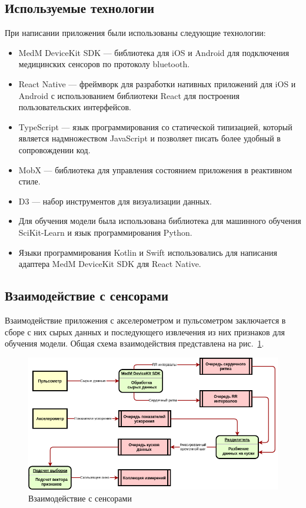 \documentclass[14pt]{matmex-diploma-custom}
\begin{document}
\subsection{Используемые технологии}
При написании приложения были использованы следующие технологии:
\begin{itemize}
\item MedM DeviceKit SDK --- библиотека для iOS и Android для подключения
  медицинских сенсоров по протоколу bluetooth.
\item React Native --- фреймворк для разработки нативных приложений для iOS и
  Android с использованием библиотеки React для построения пользовательских
  интерфейсов.
\item TypeScript --- язык программирования со статической типизацией, который
  является надмножеством JavaScript и позволяет писать более удобный в
  сопровождении код.
\item MobX --- библиотека для управления состоянием приложения в реактивном
  стиле.
\item D3 --- набор инструментов для визуализации данных.
\item Для обучения модели была использована библиотека для машинного обучения
  SciKit-Learn и язык программирования Python.
\item Языки программирования Kotlin и Swift использовались для написания
  адаптера MedM DeviceKit SDK для React Native.
\end{itemize}

\subsection{Взаимодействие с сенсорами}
Взаимодействие приложения с акселерометром и пульсометром заключается в сборе с
них сырых данных и последующего извлечения из них признаков для обучения модели.
Общая схема взаимодействия представлена на рис.~\ref{fig:sensors_interaction}.

\begin{figure}[ht]
  \centering \includegraphics[width=\textwidth]{images/sensors_interaction.png}
  \caption{Взаимодействие с сенсорами}
  \label{fig:sensors_interaction}
\end{figure}
\end{document}
